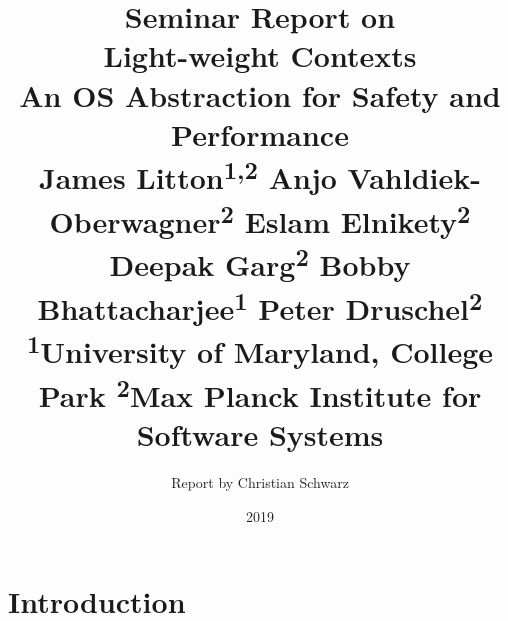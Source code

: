 \documentclass[10pt,twocolumn,letter]{article}
\begin{document}
\title{%
  {\normalfont \normalsize Seminar Report on}\\%
  Light-weight Contexts\\%
  {\normalfont \normalsize An OS Abstraction for Safety and Performance}\\%
  {\normalfont \small %
    James Litton\textsuperscript{1,2}
    Anjo Vahldiek-Oberwagner\textsuperscript{2}
    Eslam Elnikety\textsuperscript{2}
    Deepak Garg\textsuperscript{2}
    Bobby Bhattacharjee\textsuperscript{1}
    Peter Druschel\textsuperscript{2}
  }\\
  {\normalfont \small
    \textsuperscript{1}University of Maryland, College Park 
    \textsuperscript{2}Max Planck Institute for Software Systems
  }%
}
\author{Report by Christian Schwarz}
\date{2019}

\maketitle

\begin{abstract}
  \blindtext{}
\end{abstract}

\section{Introduction}\label{intro}

%
%
\end{document}
